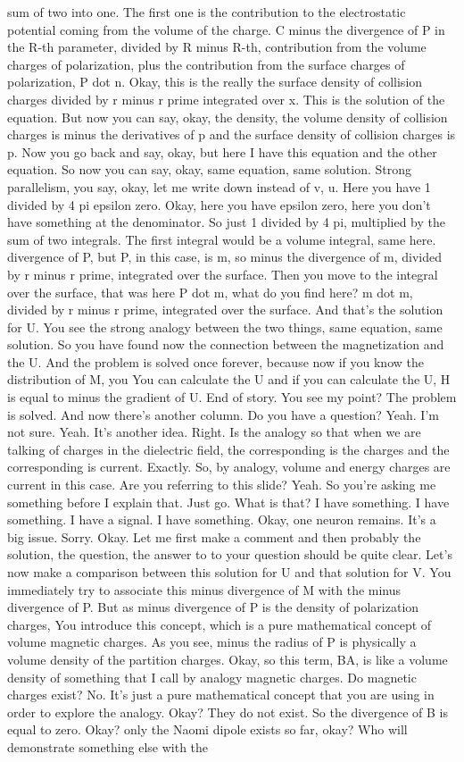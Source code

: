 sum of two into one. The first one is the contribution to the electrostatic potential coming from the volume of the charge. C minus the divergence of P in the R-th parameter, divided by R minus R-th, contribution from the volume charges of polarization, plus the contribution from the surface charges of polarization, P dot n. Okay, this is the really the surface density of collision charges divided by r minus r prime integrated over x. This is the solution of the equation. But now you can say, okay, the density, the volume density of collision charges is minus the derivatives of p and the surface density of collision charges is p. Now you go back and say, okay, but here I have this equation and the other equation. So now you can say, okay, same equation, same solution. Strong parallelism, you say, okay, let me write down instead of v, u. Here you have 1 divided by 4 pi epsilon zero. Okay, here you have epsilon zero, here you don't have something at the denominator. So just 1 divided by 4 pi, multiplied by the sum of two integrals. The first integral would be a volume integral, same here. divergence of P, but P, in this case, is m, so minus the divergence of m, divided by r minus r prime, integrated over the surface. Then you move to the integral over the surface, that was here P dot m, what do you find here? m dot m, divided by r minus r prime, integrated over the surface. And that's the solution for U. You see the strong analogy between the two things, same equation, same solution. So you have found now the connection between the magnetization and the U. And the problem is solved once forever, because now if you know the distribution of M, you You can calculate the U and if you can calculate the U, H is equal to minus the gradient of U. End of story. You see my point? The problem is solved. And now there's another column. Do you have a question? Yeah. I'm not sure. Yeah. It's another idea. Right. Is the analogy so that when we are talking of charges in the dielectric field, the corresponding is the charges and the corresponding is current. Exactly. So, by analogy, volume and energy charges are current in this case. Are you referring to this slide? Yeah. So you're asking me something before I explain that. Just go. What is that? I have something. I have something. I have a signal. I have something. Okay, one neuron remains. It's a big issue. Sorry. Okay. Let me first make a comment and then probably the solution, the question, the answer to to your question should be quite clear. Let's now make a comparison between this solution for U and that solution for V. You immediately try to associate this minus divergence of M with the minus divergence of P. But as minus divergence of P is the density of polarization charges, You introduce this concept, which is a pure mathematical concept of volume magnetic charges. As you see, minus the radius of P is physically a volume density of the partition charges. Okay, so this term, BA, is like a volume density of something that I call by analogy magnetic charges. Do magnetic charges exist? No. It's just a pure mathematical concept that you are using in order to explore the analogy. Okay? They do not exist. So the divergence of B is equal to zero. Okay? only the Naomi dipole exists so far, okay? Who will demonstrate something else with the 